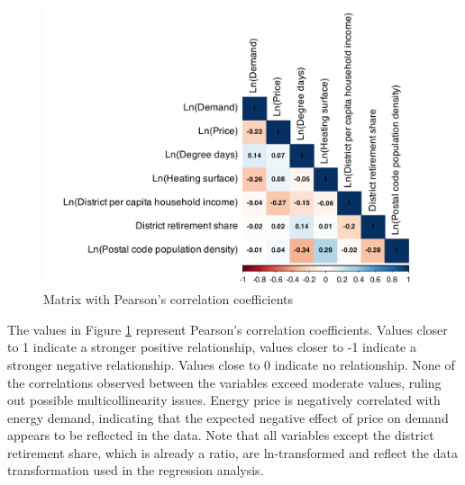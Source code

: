\documentclass[12pt,twoside]{reedthesis}
\begin{document}
\newpage
\begin{figure}

{\centering \includegraphics[width=0.9\linewidth]{figure/correlation_matrix} 

}

\caption{Matrix with Pearson’s correlation coefficients}\label{fig:correlation-plot}
\end{figure}
\noindent
The values in Figure \ref{fig:correlation-plot} represent Pearson's correlation coefficients. Values closer to 1 indicate a stronger positive relationship, values closer to -1 indicate a stronger negative relationship. Values close to 0 indicate no relationship. None of the correlations observed between the variables exceed moderate values, ruling out possible multicollinearity issues. Energy price is negatively correlated with energy demand, indicating that the expected negative effect of price on demand appears to be reflected in the data. Note that all variables except the district retirement share, which is already a ratio, are ln-transformed and reflect the data transformation used in the regression analysis.
\end{document}
